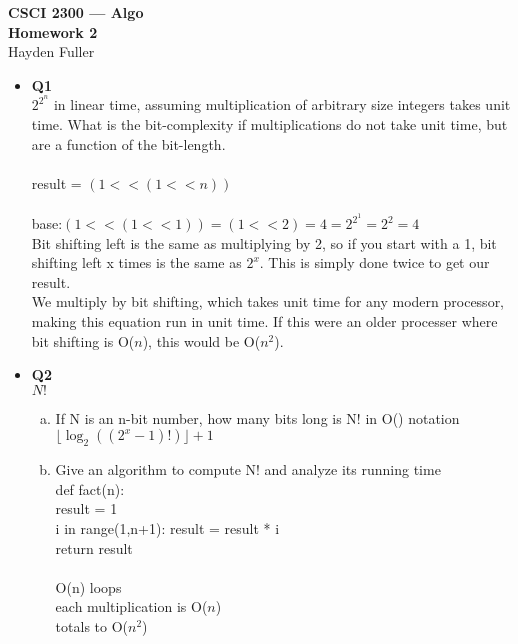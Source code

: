 \documentclass[11pt]{article}
\begin{document}
\thispagestyle{empty}   %

\begin{center}
\large
\textbf{CSCI 2300 --- Algo \\
Homework 2}
\\Hayden Fuller
\end{center}

\begin{itemize}

\item \textbf{Q1} 
\\$2^{2^n}$ in linear time, assuming multiplication of arbitrary size integers takes unit time. What is the bit-complexity if multiplications do not take unit time, but are a function of the bit-length.
\\
\\result = $(1 << (1 << n))$
\\
\\base:$(1 << (1 << 1))=(1 << 2)=4=2^{2^1}=2^2=4$
\\Bit shifting left is the same as multiplying by 2, so if you start with a 1, bit shifting left x times is the same as $2^x$. This is simply done twice to get our result.
\\We multiply by bit shifting, which takes unit time for any modern processor, making this equation run in unit time. If this were an older processer where bit shifting is O($n$), this would be O($n^2$).

\vspace{0.1in}

\item \textbf{Q2} 
\\$N!$
\begin{enumerate}[(a)]
\item If N is an n-bit number, how many bits long is N! in O() notation
\\$\lfloor \log_2((2^x-1)!)\rfloor+1$

\item Give an algorithm to compute N! and analyze its running time
\\def fact(n):
\\result = 1
\\i in range(1,n+1): result = result * i
\\return result
\\
\\O(n) loops
\\each multiplication is O($n$)
\\totals to O($n^2$)



\end{enumerate}
\end{itemize}
\end{document}
